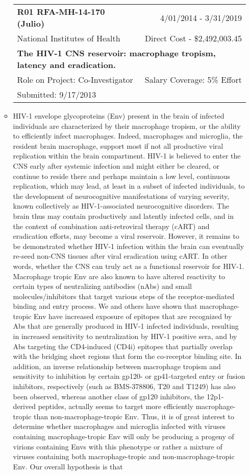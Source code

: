 \documentclass[a4paper,11pt]{article}
\makeatletter
\newenvironment{fullwidth}
    {\par
     \setlength{\@totalleftmargin}{0pt}%
     \setlength{\linewidth}{\hsize}%
     \list{}{\setlength{\leftmargin}{0pt}}
     \item\relax}
    {\endlist}
\makeatother
\begin{document}
\begin{enumerate}
\begin{itemize}
  
  \begin{longtable}{lr}
    \textbf{R01 RFA-MH-14-170 (Julio)} & 4/01/2014 - 3/31/2019 \\
    National Institutes of Health & Direct Cost - \$2,492,003.45  \\
    \multicolumn{2}{p{0.973\textwidth}}{\bfseries The HIV-1 CNS reservoir: macrophage tropism, latency and eradication.} \\
    Role on Project:  Co-Investigator & Salary Coverage: 5\% Effort \\
    Submitted: 9/17/2013\\
    \end{longtable}
    \begin{fullwidth}
     HIV-1 envelope glycoproteins (Env) present in the brain of infected individuals are characterized by their macrophage tropism, or the ability to efficiently infect macrophages. Indeed, macrophages and microglia, the resident brain macrophage, support most if not all productive viral replication within the brain compartment. HIV-1 is believed to enter the CNS early after systemic infection and might either be cleared, or continue to reside there and perhaps maintain a low level, continuous replication, which may lead, at least in a subset of infected individuals, to the development of neurocognitive manifestations of varying severity, known collectively as HIV-1-associated neurocognitive disorders. The brain thus may contain productively and latently infected cells, and in the context of combination anti-retroviral therapy (cART) and eradication efforts, may become a viral reservoir. However, it remains to be demonstrated whether HIV-1 infection within the brain can eventually re-seed non-CNS tissues after viral eradication using cART. In other words, whether the CNS can truly act as a functional reservoir for HIV-1. Macrophage tropic Env are also known to have altered reactivity to certain types of neutralizing antibodies (nAbs) and small molecules/inhibitors that target various steps of the receptor-mediated binding and entry process. We and others have shown that macrophage-tropic Env have increased exposure of epitopes that are recognized by Abs that are generally produced in HIV-1 infected individuals, resulting in increased sensitivity to neutralization by HIV-1 positive sera, and by Abs targeting the CD4-induced (CD4i) epitopes that partially overlap with the bridging sheet regions that form the co-receptor binding site. In addition, an inverse relationship between macrophage tropism and sensitivity to inhibition by certain gp120- or gp41-targeted entry or fusion inhibitors, respectively (such as BMS-378806, T20 and T1249) has also been observed, whereas another class of gp120 inhibitors, the 12p1-derived peptides, actually seems to target more efficiently macrophage-tropic than non-macrophage-tropic Env. Thus, it is of great interest to determine whether macrophages and microglia infected with viruses containing macrophage-tropic Env will only be producing a progeny of virions containing Envs with this phenotype or rather a mixture of viruses containing both macrophage-tropic and non-macrophage-tropic Env. Our overall hypothesis is that 
\end{fullwidth}
\end{itemize}
\end{enumerate}
\end{document}
